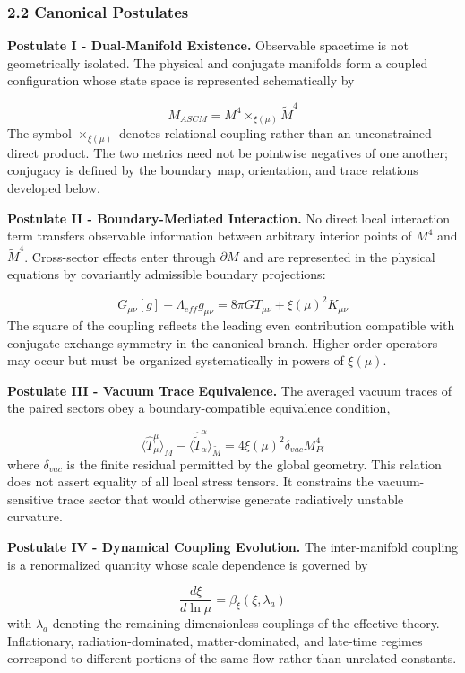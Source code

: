 \documentclass[aps,prd,onecolumn,superscriptaddress,nofootinbib,longbibliography,10pt]{revtex4-2}
\begin{document}
  
\subsubsection*{2.2 Canonical Postulates}

  \textbf{Postulate I - Dual-Manifold Existence.} Observable spacetime is not geometrically isolated. The physical and conjugate manifolds form a coupled configuration whose state space is represented schematically by


  \[ M_{ASCM} = M^4 \times_{\xi(\mu)} \tilde{M}^4 \]
  The symbol \(\times_{\xi(\mu)}\) denotes relational coupling rather than an unconstrained direct product. The two metrics need not be pointwise negatives of one another; conjugacy is defined by the boundary map, orientation, and trace relations developed below.


  \textbf{Postulate II - Boundary-Mediated Interaction.} No direct local interaction term transfers observable information between arbitrary interior points of \(M^4\) and \(\tilde{M}^4\). Cross-sector effects enter through \(\partial M\) and are represented in the physical equations by covariantly admissible boundary projections:


  \[ G_{\mu\nu}[g] + \Lambda_{eff} g_{\mu\nu} = 8\pi G T_{\mu\nu} + \xi(\mu)^2 K_{\mu\nu} \]
  The square of the coupling reflects the leading even contribution compatible with conjugate exchange symmetry in the canonical branch. Higher-order operators may occur but must be organized systematically in powers of \(\xi(\mu)\).


  \textbf{Postulate III - Vacuum Trace Equivalence.} The averaged vacuum traces of the paired sectors obey a boundary-compatible equivalence condition,


  \[ \langle \hat{T}^\mu_\mu \rangle_M - \langle \hat{\tilde{T}}^\alpha_\alpha \rangle_{\tilde{M}} = 4\xi(\mu)^2 \delta_{vac} M_{Pl}^4 \]
  where \(\delta_{vac}\) is the finite residual permitted by the global geometry. This relation does not assert equality of all local stress tensors. It constrains the vacuum-sensitive trace sector that would otherwise generate radiatively unstable curvature.


  \textbf{Postulate IV - Dynamical Coupling Evolution.} The inter-manifold coupling is a renormalized quantity whose scale dependence is governed by


  \[ \frac{d\xi}{d\ln\mu} = \beta_\xi(\xi, \lambda_a) \]
  with \(\lambda_a\) denoting the remaining dimensionless couplings of the effective theory. Inflationary, radiation-dominated, matter-dominated, and late-time regimes correspond to different portions of the same flow rather than unrelated constants.
\end{document}
